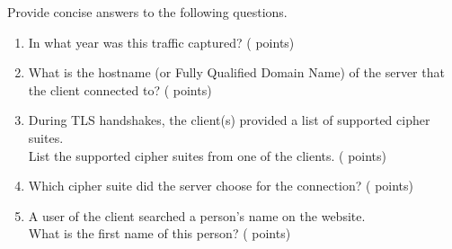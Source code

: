 \medskip

Provide concise answers to the following questions.

\newcommand{\fileyear}{\ref*{sec:cp1.2}.\ref*{itm:year}.txt}
\newcommand{\filedomain}{\ref*{sec:cp1.2}.\ref*{itm:domain}.txt}
\newcommand{\filecslist}{\ref*{sec:cp1.2}.\ref*{itm:cslist}.txt}
\newcommand{\fileservercs}{\ref*{sec:cp1.2}.\ref*{itm:servercs}.txt}
\newcommand{\filename}{\ref*{sec:cp1.2}.\ref*{itm:name}.txt}
\newcommand{\filemsg}{\ref*{sec:cp1.2}.\ref*{itm:msg}.txt}
\newcommand{\filecookie}{\ref*{sec:cp1.2}.\ref*{itm:cookie}.txt}

\begin{enumerate}
  \item \hypertarget{cp1year}{In what year was this traffic captured? ( points)} \label{itm:year}

  \item \hypertarget{cp1domain}{What is the hostname (or Fully Qualified Domain Name) of the server that the client connected to? ( points)} \label{itm:domain}

  \item \hypertarget{cp1cslist}{During TLS handshakes, the client(s) provided a list of supported cipher suites.\\
  List the supported cipher suites from one of the clients. ( points)} \label{itm:cslist}


  \item \hypertarget{cp1servercs}{Which cipher suite did the server choose for the connection? ( points)} \label{itm:servercs}


  \item \hypertarget{cp1name}{A user of the client searched a person's name on the website.\\
  What is the first name of this person? ( points)} \label{itm:name}


\end{enumerate}
